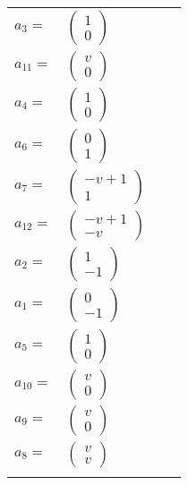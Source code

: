\documentclass[1p]{elsarticle_modified}
\theoremstyle{definition}
\begin{document}
\begin{tabular}{m{7pt} m{180pt} m{7pt} m{180pt} }
\flushright $a_{3}=$&$\begin{pmatrix}1\\0\end{pmatrix}$ \\
\flushright $a_{11}=$&$\begin{pmatrix}v\\0\end{pmatrix}$ \\
\flushright $a_{4}=$&$\begin{pmatrix}1\\0\end{pmatrix}$ \\
\flushright $a_{6}=$&$\begin{pmatrix}0\\1\end{pmatrix}$ \\
\flushright $a_{7}=$&$\begin{pmatrix}- v+1\\1\end{pmatrix}$ \\
\flushright $a_{12}=$&$\begin{pmatrix}- v+1\\- v\end{pmatrix}$ \\
\flushright $a_{2}=$&$\begin{pmatrix}1\\-1\end{pmatrix}$ \\
\flushright $a_{1}=$&$\begin{pmatrix}0\\-1\end{pmatrix}$ \\
\flushright $a_{5}=$&$\begin{pmatrix}1\\0\end{pmatrix}$ \\
\flushright $a_{10}=$&$\begin{pmatrix}v\\0\end{pmatrix}$ \\
\flushright $a_{9}=$&$\begin{pmatrix}v\\0\end{pmatrix}$ \\
\flushright $a_{8}=$&$\begin{pmatrix}v\\v\end{pmatrix}$\\&\end{tabular}
\end{document}
